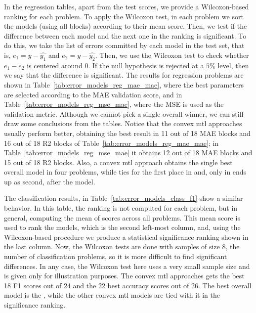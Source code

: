 In the regression tables, apart from the test scores, we provide a Wilcoxon-based ranking for each problem. 
%
To apply the Wilcoxon test, in each problem we sort the models (using all blocks) according to their mean score. Then, we test if the difference between each model and the next one in the ranking is significant. To do this, we take the list of errors committed by each model in the test set, that is, $e_1 = y - \hat{y_1}$ and $e_2 = y - \hat{y_2}$. Then, we use the Wilcoxon test to check whether $e_1 - e_2$ is centered around 0.
If the null hypothesis is rejected at a $5\%$ level, then we say that the difference is significant.
%
%
The results for regression problems are shown in Table~\ref{tab:error_models_reg_mae_mae}, where the best parameters are selected according to the MAE validation score, and in Table~\ref{tab:error_models_reg_mse_mae}, where the MSE is used as the validation metric.
%
Although we cannot pick a single overall winner, we can still draw some conclusions from the tables. Notice that the convex \acrshort{mtl} approaches usually perform better, obtaining the best result in 11 out of 18 MAE blocks and 16 out of 18 R2 blocks of Table~\ref{tab:error_models_reg_mae_mae}; in Table~\ref{tab:error_models_reg_mse_mae} it obtains 12 out of 18 MAE blocks and 15 out of 18 R2 blocks.
Also, a convex \acrshort{mtl} approach obtains the single best overall model in four problems, while ties for the first place in  and, only in  ends up as second, after the  model.

The classification results, in Table~\ref{tab:error_models_class_f1} show a similar behavior. In this table, the ranking is not computed for each problem, but in general, computing the mean of scores across all problems. This mean score is used to rank the models, which is the second left-most column, and, using the Wilcoxon-based procedure we produce a statistical significance ranking shown in the last column. Now, the Wilcoxon tests are done with samples of size $8$, the number of classification problems, so it is more difficult to find significant differences. In any case, the Wilcoxon test here uses a very small sample size and is given only for illustration purposes.
The convex \acrshort{mtl} approaches gets the best 18 F1 scores out of 24 and the 22 best accuracy scores out of 26. The best overall model is the , while the other convex \acrshort{mtl} models are tied with it in the significance ranking.

